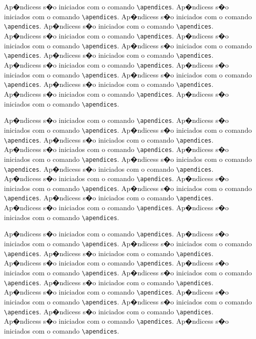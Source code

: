 Ap�ndicess s�o iniciados com o comando \verb|\apendices|.
Ap�ndicess s�o iniciados com o comando \verb|\apendices|.
Ap�ndicess s�o iniciados com o comando \verb|\apendices|.
Ap�ndicess s�o iniciados com o comando \verb|\apendices|.
Ap�ndicess s�o iniciados com o comando \verb|\apendices|.
Ap�ndicess s�o iniciados com o comando \verb|\apendices|.
Ap�ndicess s�o iniciados com o comando \verb|\apendices|.
Ap�ndicess s�o iniciados com o comando \verb|\apendices|.
Ap�ndicess s�o iniciados com o comando \verb|\apendices|.
Ap�ndicess s�o iniciados com o comando \verb|\apendices|.
Ap�ndicess s�o iniciados com o comando \verb|\apendices|.
Ap�ndicess s�o iniciados com o comando \verb|\apendices|.
Ap�ndicess s�o iniciados com o comando \verb|\apendices|.
Ap�ndicess s�o iniciados com o comando \verb|\apendices|.

Ap�ndicess s�o iniciados com o comando \verb|\apendices|.
Ap�ndicess s�o iniciados com o comando \verb|\apendices|.
Ap�ndicess s�o iniciados com o comando \verb|\apendices|.
Ap�ndicess s�o iniciados com o comando \verb|\apendices|.
Ap�ndicess s�o iniciados com o comando \verb|\apendices|.
Ap�ndicess s�o iniciados com o comando \verb|\apendices|.
Ap�ndicess s�o iniciados com o comando \verb|\apendices|.
Ap�ndicess s�o iniciados com o comando \verb|\apendices|.
Ap�ndicess s�o iniciados com o comando \verb|\apendices|.
Ap�ndicess s�o iniciados com o comando \verb|\apendices|.
Ap�ndicess s�o iniciados com o comando \verb|\apendices|.
Ap�ndicess s�o iniciados com o comando \verb|\apendices|.
Ap�ndicess s�o iniciados com o comando \verb|\apendices|.
Ap�ndicess s�o iniciados com o comando \verb|\apendices|.

Ap�ndicess s�o iniciados com o comando \verb|\apendices|.
Ap�ndicess s�o iniciados com o comando \verb|\apendices|.
Ap�ndicess s�o iniciados com o comando \verb|\apendices|.
Ap�ndicess s�o iniciados com o comando \verb|\apendices|.
Ap�ndicess s�o iniciados com o comando \verb|\apendices|.
Ap�ndicess s�o iniciados com o comando \verb|\apendices|.
Ap�ndicess s�o iniciados com o comando \verb|\apendices|.
Ap�ndicess s�o iniciados com o comando \verb|\apendices|.
Ap�ndicess s�o iniciados com o comando \verb|\apendices|.
Ap�ndicess s�o iniciados com o comando \verb|\apendices|.
Ap�ndicess s�o iniciados com o comando \verb|\apendices|.
Ap�ndicess s�o iniciados com o comando \verb|\apendices|.
Ap�ndicess s�o iniciados com o comando \verb|\apendices|.
Ap�ndicess s�o iniciados com o comando \verb|\apendices|.


